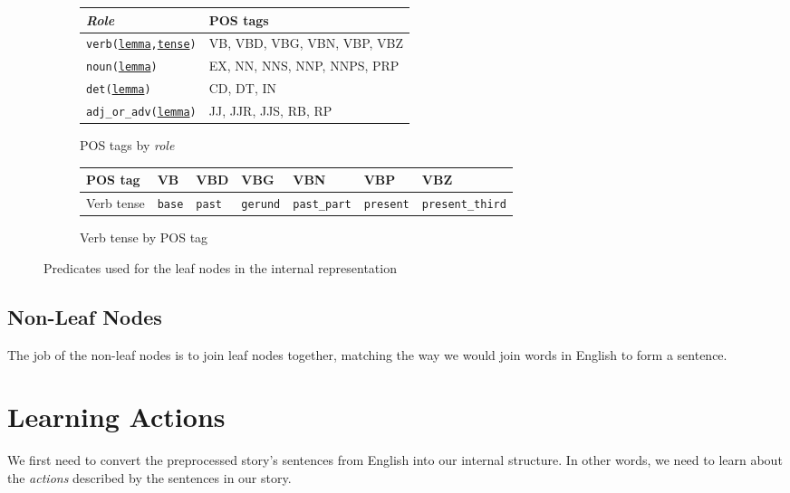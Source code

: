 \begin{figure}[H]
\begin{subfigure}{\textwidth}
\centering
\begin{tabular}{@{}ll@{}}
\toprule
\textit{Role}         & POS tags                    \\ \midrule
\texttt{verb(\underline{lemma},\underline{tense})}         & VB, VBD, VBG, VBN, VBP, VBZ \\
\texttt{noun(\underline{lemma})}         & EX, NN, NNS, NNP, NNPS, PRP \\
\texttt{det(\underline{lemma})}          & CD, DT, IN                  \\
\texttt{adj\_or\_adv(\underline{lemma})} & JJ, JJR, JJS, RB, RP        \\ \bottomrule
\end{tabular}
\caption{POS tags by \textit{role}}
\vspace{\baselineskip}
\end{subfigure}
\begin{subfigure}{\textwidth}
\centering
\begin{tabular}{@{}lllllll@{}}
\toprule
POS tag  & VB   & VBD  & VBG    & VBN        & VBP     & VBZ            \\ \midrule
Verb tense & \texttt{base} & \texttt{past} & \texttt{gerund} & \texttt{past\_part} & \texttt{present} & \texttt{present\_third} \\ \bottomrule
\end{tabular}
\caption{Verb tense by POS tag}
\vspace{\baselineskip}
\end{subfigure}
\caption{Predicates used for the leaf nodes in the internal representation}
\label{fig:leaf_nodes}
\end{figure}

\subsection{Non-Leaf Nodes}

The job of the non-leaf nodes is to join leaf nodes together, matching the way we would join words in English to form a sentence.

\section{Learning Actions}

We first need to convert the preprocessed story's sentences from English into our internal structure. In other words, we need to learn about the \textit{actions} described by the sentences in our story.

